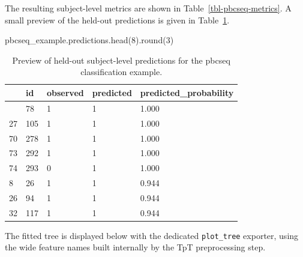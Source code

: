 \documentclass[
  letterpaper,
  DIV=11,
  numbers=noendperiod]{scrartcl}
\newenvironment{Shaded}{\begin{snugshade}}{\end{snugshade}}
\newcommand{\BuiltInTok}[1]{\textcolor[rgb]{0.00,0.23,0.31}{#1}}
\newcommand{\DecValTok}[1]{\textcolor[rgb]{0.68,0.00,0.00}{#1}}
\newcommand{\NormalTok}[1]{\textcolor[rgb]{0.00,0.23,0.31}{#1}}
\begin{document}
The resulting subject-level metrics are shown in
Table~\ref{tbl-pbcseq-metrics}. A small preview of the held-out
predictions is given in Table~\ref{tbl-pbcseq-predictions}.

\begin{Shaded}
\begin{Highlighting}[]
\NormalTok{pbcseq\_example.predictions.head(}\DecValTok{8}\NormalTok{).}\BuiltInTok{round}\NormalTok{(}\DecValTok{3}\NormalTok{)}
\end{Highlighting}
\end{Shaded}

\begin{longtable}[]{@{}lllll@{}}

\caption{\label{tbl-pbcseq-predictions}Preview of held-out subject-level
predictions for the pbcseq classification example.}

\tabularnewline

\toprule\noalign{}
& id & observed & predicted & predicted\_probability \\
\midrule\noalign{}
\endhead
\bottomrule\noalign{}
\endlastfoot
22 & 78 & 1 & 1 & 1.000 \\
27 & 105 & 1 & 1 & 1.000 \\
70 & 278 & 1 & 1 & 1.000 \\
73 & 292 & 1 & 1 & 1.000 \\
74 & 293 & 0 & 1 & 1.000 \\
8 & 26 & 1 & 1 & 0.944 \\
26 & 94 & 1 & 1 & 0.944 \\
32 & 117 & 1 & 1 & 0.944 \\

\end{longtable}

The fitted tree is displayed below with the dedicated
\texttt{plot\_tree} exporter, using the wide feature names built
internally by the TpT preprocessing step.
\end{document}
